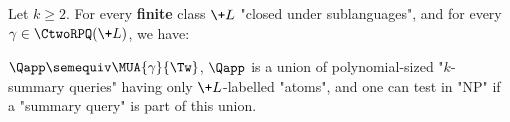 \begin{lemma}\AP\label{lemma:MUAk-union-of-polysized-summary-test-np}
    \AP Let $k \geq 2$. For every \textbf{finite} class $\+L$ "closed under sublanguages",
	and for every $\gamma \in \CtwoRPQ(\+L)$, 
	we have:
	\begin{enumerate}
		\itemAP \label{lemma:MUAk-union-of-polysized-summary-test-np:1} $\Qapp \semequiv \MUA{\gamma}{\Tw}$,
		\itemAP \label{lemma:MUAk-union-of-polysized-summary-test-np:2} $\Qapp$ is a union of polynomial-sized "$k$-summary queries" having only
			$\+L$-labelled "atoms", and
		\itemAP \label{lemma:MUAk-union-of-polysized-summary-test-np:3} one can test in "NP" if a "summary query" is part of this union.
	\end{enumerate}
\end{lemma}
  
